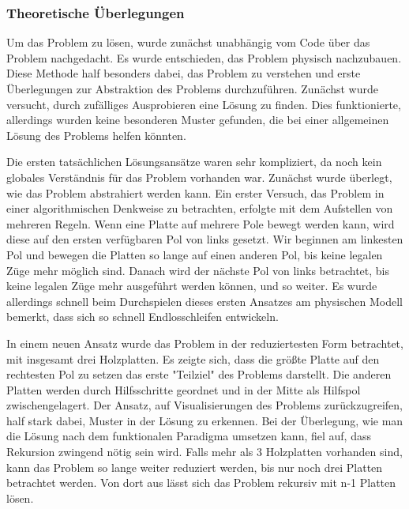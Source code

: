 \subsubsection{Theoretische Überlegungen}
Um das Problem zu lösen, wurde zunächst unabhängig vom Code über das Problem nachgedacht. Es wurde entschieden, das Problem physisch nachzubauen. Diese Methode half besonders dabei, das Problem zu verstehen und erste Überlegungen zur Abstraktion des Problems durchzuführen. Zunächst wurde versucht, durch zufälliges Ausprobieren eine Lösung zu finden. Dies funktionierte, allerdings wurden keine besonderen Muster gefunden, die bei einer allgemeinen Lösung des Problems helfen könnten.

Die ersten tatsächlichen Lösungsansätze waren sehr kompliziert, da noch kein globales Verständnis für das Problem vorhanden war. Zunächst wurde überlegt, wie das Problem abstrahiert werden kann. Ein erster Versuch, das Problem in einer algorithmischen Denkweise zu betrachten, erfolgte mit dem Aufstellen von mehreren Regeln. Wenn eine Platte auf mehrere Pole bewegt werden kann, wird diese auf den ersten verfügbaren Pol von links gesetzt. Wir beginnen am linkesten Pol und bewegen die Platten so lange auf einen anderen Pol, bis keine legalen Züge mehr möglich sind. Danach wird der nächste Pol von links betrachtet, bis keine legalen Züge mehr ausgeführt werden können, und so weiter.
Es wurde allerdings schnell beim Durchspielen dieses ersten Ansatzes am physischen Modell bemerkt, dass sich so schnell Endlosschleifen entwickeln.

In einem neuen Ansatz wurde das Problem in der reduziertesten Form betrachtet, mit insgesamt drei Holzplatten. Es zeigte sich, dass die größte Platte auf den rechtesten Pol zu setzen das erste "Teilziel" des Problems darstellt. Die anderen Platten werden durch Hilfsschritte geordnet und in der Mitte als Hilfspol zwischengelagert. Der Ansatz, auf Visualisierungen des Problems zurückzugreifen, half stark dabei, Muster in der Lösung zu erkennen.
Bei der Überlegung, wie man die Lösung nach dem funktionalen Paradigma umsetzen kann, fiel auf, dass Rekursion zwingend nötig sein wird. Falls mehr als 3 Holzplatten vorhanden sind, kann das Problem so lange weiter reduziert werden, bis nur noch drei Platten betrachtet werden. Von dort aus lässt sich das Problem rekursiv mit n-1 Platten lösen.

